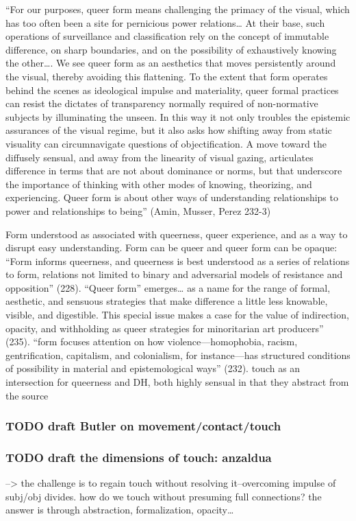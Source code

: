 \documentclass[11pt]{article}
\begin{document}
“For our purposes, queer form means challenging the primacy of the
visual, which has too often been a site for pernicious power
relations… At their base, such operations of surveillance and
classification rely on the concept of immutable difference, on sharp
boundaries, and on the possibility of exhaustively knowing the
other…. We see queer form as an aesthetics that moves persistently
around the visual, thereby avoiding this flattening. To the extent
that form operates behind the scenes as ideological impulse and
materiality, queer formal practices can resist the dictates of
transparency normally required of non-normative subjects by
illuminating the unseen. In this way it not only troubles the
epistemic assurances of the visual regime, but it also asks how
shifting away from static visuality can circumnavigate questions of
objectification. A move toward the diffusely sensual, and away from
the linearity of visual gazing, articulates difference in terms that
are not about dominance or norms, but that underscore the importance
of thinking with other modes of knowing, theorizing, and
experiencing. Queer form is about other ways of understanding
relationships to power and relationships to being” (Amin, Musser,
Perez 232-3)

Form understood as associated with queerness, queer experience, and as a way to disrupt easy understanding. Form can be queer and queer form can be opaque: 
“Form informs queerness, and queerness is best understood as a series of relations to form, relations not limited to binary and adversarial models of resistance and opposition” (228).
“Queer form” emerges… as a name for the range of formal, aesthetic, and sensuous strategies that make difference a little less knowable, visible, and digestible. This special issue makes a case for the value of indirection, opacity, and withholding as queer strategies for minoritarian art producers” (235).
 “form focuses attention on how violence—homophobia, racism, gentrification, capitalism, and colonialism, for instance—has structured conditions of possibility in material and epistemological ways” (232).
touch as an intersection for queerness and DH, both highly sensual
in that they abstract from the source

\subsubsection{{\bfseries\sffamily TODO} draft Butler on movement/contact/touch}
\label{sec:org66799ac}
\subsubsection{{\bfseries\sffamily TODO} draft the dimensions of touch: anzaldua}
\label{sec:org2dfa982}
--> the challenge is to regain touch without resolving it--overcoming
impulse of subj/obj divides. how do we touch without presuming full
connections? the answer is through abstraction, formalization,
opacity\ldots{}
\end{document}
